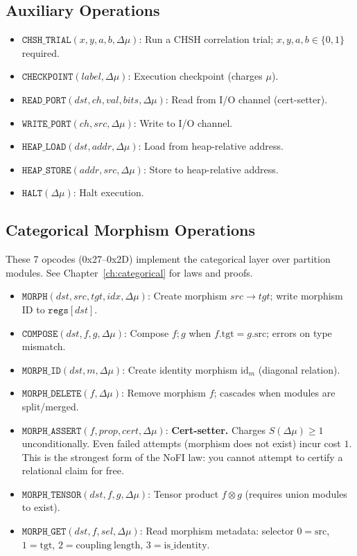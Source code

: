 \documentclass[11pt, a4paper]{report}
\theoremstyle{definition}
\theoremstyle{plain}
\begin{document}
\subsection{Auxiliary Operations}
\begin{itemize}
    \item $\texttt{CHSH\_TRIAL}(x, y, a, b, \Delta\mu)$: Run a CHSH correlation trial; $x,y,a,b \in \{0,1\}$ required.
    \item $\texttt{CHECKPOINT}(\mathit{label}, \Delta\mu)$: Execution checkpoint (charges $\mu$).
    \item $\texttt{READ\_PORT}(\mathit{dst}, \mathit{ch}, \mathit{val}, \mathit{bits}, \Delta\mu)$: Read from I/O channel (cert-setter).
    \item $\texttt{WRITE\_PORT}(\mathit{ch}, \mathit{src}, \Delta\mu)$: Write to I/O channel.
    \item $\texttt{HEAP\_LOAD}(\mathit{dst}, \mathit{addr}, \Delta\mu)$: Load from heap-relative address.
    \item $\texttt{HEAP\_STORE}(\mathit{addr}, \mathit{src}, \Delta\mu)$: Store to heap-relative address.
    \item $\texttt{HALT}(\Delta\mu)$: Halt execution.
\end{itemize}

\subsection{Categorical Morphism Operations}
These 7 opcodes (0x27--0x2D) implement the categorical layer over partition modules. See Chapter~\ref{ch:categorical} for laws and proofs.
\begin{itemize}
    \item $\texttt{MORPH}(\mathit{dst}, \mathit{src}, \mathit{tgt}, \mathit{idx}, \Delta\mu)$: Create morphism $\mathit{src} \to \mathit{tgt}$; write morphism ID to $\texttt{regs}[\mathit{dst}]$.
    \item $\texttt{COMPOSE}(\mathit{dst}, f, g, \Delta\mu)$: Compose $f;g$ when $f.\mathrm{tgt} = g.\mathrm{src}$; errors on type mismatch.
    \item $\texttt{MORPH\_ID}(\mathit{dst}, m, \Delta\mu)$: Create identity morphism $\mathrm{id}_m$ (diagonal relation).
    \item $\texttt{MORPH\_DELETE}(f, \Delta\mu)$: Remove morphism $f$; cascades when modules are split/merged.
    \item $\texttt{MORPH\_ASSERT}(f, \mathit{prop}, \mathit{cert}, \Delta\mu)$: \textbf{Cert-setter.} Charges $S(\Delta\mu) \geq 1$ unconditionally. Even failed attempts (morphism does not exist) incur cost $1$. This is the strongest form of the NoFI law: you cannot attempt to certify a relational claim for free.
    \item $\texttt{MORPH\_TENSOR}(\mathit{dst}, f, g, \Delta\mu)$: Tensor product $f \otimes g$ (requires union modules to exist).
    \item $\texttt{MORPH\_GET}(\mathit{dst}, f, \mathit{sel}, \Delta\mu)$: Read morphism metadata: selector $0=\mathrm{src}$, $1=\mathrm{tgt}$, $2=\mathrm{coupling\ length}$, $3=\mathrm{is\_identity}$.
\end{itemize}
\end{document}

